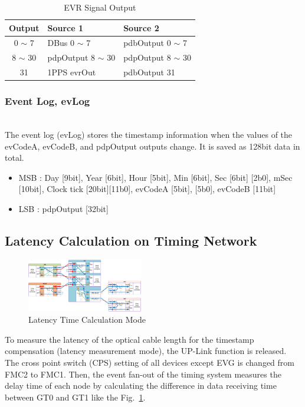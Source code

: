 \documentclass[journal,reqno]{IEEEtran}
\begin{document}
\begin{table}[h!t]
	\centering
	\caption{EVR Signal Output}
	\label{evr_signal_output}
	
	\begin{tabular}{@{}cll@{}}
		
		\hline
		\textbf{Output}	& \textbf{Source 1}				& \textbf{Source 2}\\
		\hline
		0 $\sim$ 7			& DBus 0 $\sim$ 7			& pdbOutput 0 $\sim$ 7\\
		8 $\sim$ 30			& pdpOutput 8 $\sim$ 30     & pdpOutput 8 $\sim$ 30 \\
		31				& 1PPS evrOut					& pdbOutput 31\\        								
		\hline
	\end{tabular}
\end{table}

\subsubsection{Event Log, evLog}\hspace*{\fill} \\
The event log (evLog) stores the timestamp information when the values of the evCodeA, evCodeB, and pdpOutput outputs change. It is saved as 128bit data in total.\newline

\begin{itemize}
	\item MSB :	Day [9bit], Year [6bit], Hour [5bit], Min [6bit], Sec [6bit] [2b0], mSec [10bit], Clock tick [20bit][11b0], evCodeA [5bit], [5b0], evCodeB [11bit]
	\item LSB :	pdpOutput [32bit]
\end{itemize}

\subsection{Latency Calculation on Timing Network}
\begin{figure}[!htb]
	\centering
	\includegraphics*[width=0.45\textwidth, height=0.3\textwidth]{img15.png}
	\caption{Latency Time Calculation Mode}
	\label{latency_time_mode}
\end{figure}
To measure the latency of the optical cable length for the timestamp compensation (latency measurement mode), the UP-Link function is released. The cross point switch (CPS) setting of all devices except EVG is changed from FMC2 to FMC1. Then, the event fan-out of the timing system measures the delay time of each node by calculating the difference in data receiving time between GT0 and GT1 like the Fig.~\ref{latency_time_mode}.
\end{document}
